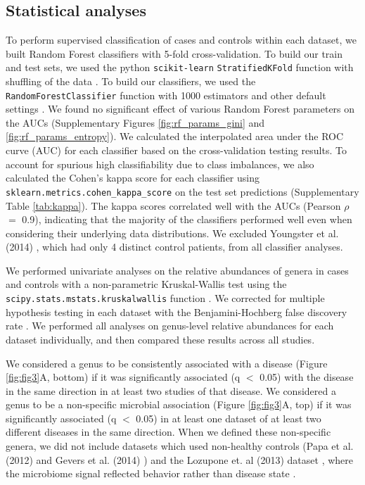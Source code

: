 {\subsection*{Statistical analyses}
To perform supervised classification of cases and controls within each dataset, we built Random Forest classifiers with 5-fold cross-validation.
To build our train and test sets, we used the python \texttt{scikit-learn} \texttt{StratifiedKFold} function with shuffling of the data \cite{scikit-learn}.
To build our classifiers, we used the \texttt{RandomForestClassifier} function with 1000 estimators and other default settings \cite{scikit-learn}.
We found no significant effect of various Random Forest parameters on the AUCs  (Supplementary Figures \ref{fig:rf_params_gini} and \ref{fig:rf_params_entropy}).
We calculated the interpolated area under the ROC curve (AUC) for each classifier based on the cross-validation testing results.
To account for spurious high classifiability due to class imbalances, we also calculated the Cohen's kappa score for each classifier using \texttt{sklearn.metrics.cohen\_kappa\_score} on the test set predictions (Supplementary Table \ref{tab:kappa}).
The kappa scores correlated well with the AUCs (Pearson $\rho$ $=$ 0.9), indicating that the majority of the classifiers performed well even when considering their underlying data distributions.
We excluded Youngster et al. (2014) \cite{cdi-youngster}, which had only 4 distinct control patients, from all classifier analyses.

We performed univariate analyses on the relative abundances of genera in cases and controls with a non-parametric Kruskal-Wallis test using the \\ \texttt{scipy.stats.mstats.kruskalwallis} function \cite{scipy}.
We corrected for multiple hypothesis testing in each dataset with the Benjamini-Hochberg false discovery rate \cite{benjamini-hochberg}.
We performed all analyses on genus-level relative abundances for each dataset individually, and then compared these results across all studies.

We considered a genus to be consistently associated with a disease (Figure \ref{fig:fig3}A, bottom) if it was significantly associated (q $<$ 0.05) with the disease in the same direction in at least two studies of that disease.
We considered a genus to be a non-specific microbial association (Figure \ref{fig:fig3}A, top) if it was significantly associated (q $<$ 0.05) in at least one dataset of at least two different diseases in the same direction.
When we defined these non-specific genera, we did not include datasets which used non-healthy controls (Papa et al. (2012) \cite{ibd-papa} and Gevers et al. (2014) \cite{ibd-gevers}) and the Lozupone et. al (2013) dataset \cite{lozupone2013alterations}, where the microbiome signal reflected behavior rather than disease state \cite{noguera2016gut}.

}
